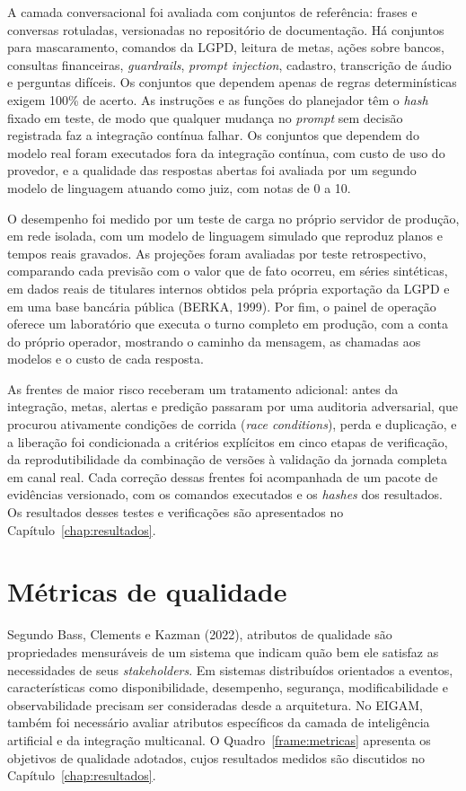 A camada conversacional foi avaliada com conjuntos de referência: frases e conversas rotuladas, versionadas no repositório de documentação. Há conjuntos para mascaramento, comandos da LGPD, leitura de metas, ações sobre bancos, consultas financeiras, \textit{guardrails}, \textit{prompt injection}, cadastro, transcrição de áudio e perguntas difíceis. Os conjuntos que dependem apenas de regras determinísticas exigem 100\% de acerto. As instruções e as funções do planejador têm o \textit{hash} fixado em teste, de modo que qualquer mudança no \textit{prompt} sem decisão registrada faz a integração contínua falhar. Os conjuntos que dependem do modelo real foram executados fora da integração contínua, com custo de uso do provedor, e a qualidade das respostas abertas foi avaliada por um segundo modelo de linguagem atuando como juiz, com notas de 0 a 10.

O desempenho foi medido por um teste de carga no próprio servidor de produção, em rede isolada, com um modelo de linguagem simulado que reproduz planos e tempos reais gravados. As projeções foram avaliadas por teste retrospectivo, comparando cada previsão com o valor que de fato ocorreu, em séries sintéticas, em dados reais de titulares internos obtidos pela própria exportação da LGPD e em uma base bancária pública (BERKA, 1999). Por fim, o painel de operação oferece um laboratório que executa o turno completo em produção, com a conta do próprio operador, mostrando o caminho da mensagem, as chamadas aos modelos e o custo de cada resposta.

As frentes de maior risco receberam um tratamento adicional: antes da integração, metas, alertas e predição passaram por uma auditoria adversarial, que procurou ativamente condições de corrida (\textit{race conditions}), perda e duplicação, e a liberação foi condicionada a critérios explícitos em cinco etapas de verificação, da reprodutibilidade da combinação de versões à validação da jornada completa em canal real. Cada correção dessas frentes foi acompanhada de um pacote de evidências versionado, com os comandos executados e os \textit{hashes} dos resultados. Os resultados desses testes e verificações são apresentados no Capítulo~\ref{chap:resultados}.

\section{Métricas de qualidade}

Segundo Bass, Clements e Kazman (2022), atributos de qualidade são propriedades mensuráveis de um sistema que indicam quão bem ele satisfaz as necessidades de seus \textit{stakeholders}. Em sistemas distribuídos orientados a eventos, características como disponibilidade, desempenho, segurança, modificabilidade e observabilidade precisam ser consideradas desde a arquitetura. No EIGAM, também foi necessário avaliar atributos específicos da camada de inteligência artificial e da integração multicanal. O Quadro~\ref{frame:metricas} apresenta os objetivos de qualidade adotados, cujos resultados medidos são discutidos no Capítulo~\ref{chap:resultados}.

